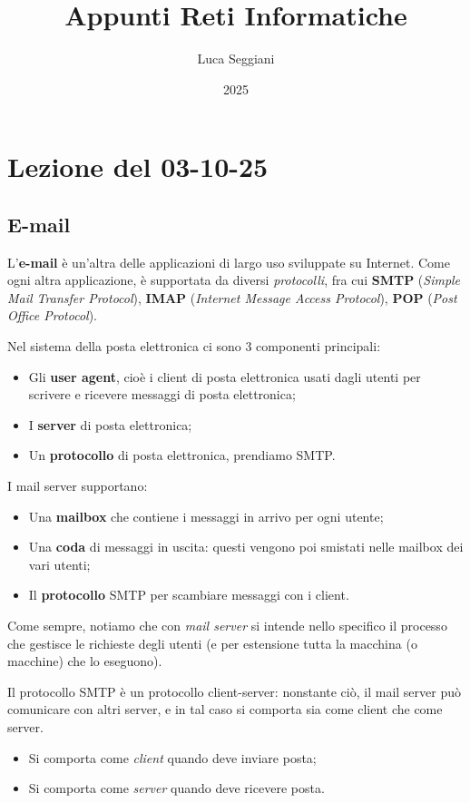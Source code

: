 \documentclass[a4paper,11pt]{article}
\title{Appunti Reti Informatiche}
\author{Luca Seggiani}
\date{2025}
\begin{document}
\section{Lezione del 03-10-25}

\thispagestyle{empty}
\pagestyle{fancy}

\subsection{E-mail}
L'\textbf{e-mail} è un'altra delle applicazioni di largo uso sviluppate su Internet. Come ogni altra applicazione, è supportata da diversi \textit{protocolli}, fra cui \textbf{SMTP} (\textit{Simple Mail Transfer Protocol}), \textbf{IMAP} (\textit{Internet Message Access Protocol}), \textbf{POP} (\textit{Post Office Protocol}).

Nel sistema della posta elettronica ci sono 3 componenti principali:
\begin{itemize}
	\item Gli \textbf{user agent}, cioè i client di posta elettronica usati dagli utenti per scrivere e ricevere messaggi di posta elettronica;
	\item I \textbf{server} di posta elettronica;
	\item Un \textbf{protocollo} di posta elettronica, prendiamo SMTP. 
\end{itemize}

I mail server supportano:
\begin{itemize}
	\item Una \textbf{mailbox} che contiene i messaggi in arrivo per ogni utente;
	\item Una \textbf{coda} di messaggi in uscita: questi vengono poi smistati nelle mailbox dei vari utenti;
	\item Il \textbf{protocollo} SMTP per scambiare messaggi con i client.
\end{itemize}

Come sempre, notiamo che con \textit{mail server} si intende nello specifico il processo che gestisce le richieste degli utenti (e per estensione tutta la macchina (o macchine) che lo eseguono).

Il protocollo SMTP è un protocollo client-server: nonstante ciò, il mail server può comunicare con altri server, e in tal caso si comporta sia come client che come server.
\begin{itemize}
	\item Si comporta come \textit{client} quando deve inviare posta;
	\item Si comporta come \textit{server} quando deve ricevere posta.
\end{itemize}
\end{document}
